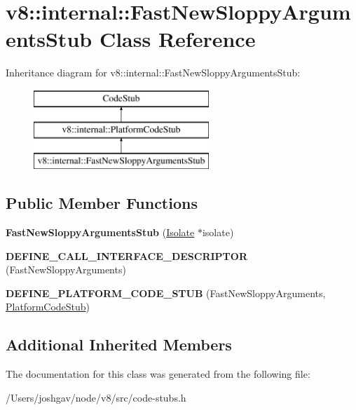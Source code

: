\hypertarget{classv8_1_1internal_1_1_fast_new_sloppy_arguments_stub}{}\section{v8\+:\+:internal\+:\+:Fast\+New\+Sloppy\+Arguments\+Stub Class Reference}
\label{classv8_1_1internal_1_1_fast_new_sloppy_arguments_stub}
Inheritance diagram for v8\+:\+:internal\+:\+:Fast\+New\+Sloppy\+Arguments\+Stub\+:\begin{figure}[H]
\begin{center}
\leavevmode
\includegraphics[height=3.000000cm]{classv8_1_1internal_1_1_fast_new_sloppy_arguments_stub}
\end{center}
\end{figure}
\subsection*{Public Member Functions}
\begin{DoxyCompactItemize}
\item 
{\bfseries Fast\+New\+Sloppy\+Arguments\+Stub} (\hyperlink{classv8_1_1internal_1_1_isolate}{Isolate} $\ast$isolate)\hypertarget{classv8_1_1internal_1_1_fast_new_sloppy_arguments_stub_a064f80177e8a72441a131e6f438150ca}{}\label{classv8_1_1internal_1_1_fast_new_sloppy_arguments_stub_a064f80177e8a72441a131e6f438150ca}

\item 
{\bfseries D\+E\+F\+I\+N\+E\+\_\+\+C\+A\+L\+L\+\_\+\+I\+N\+T\+E\+R\+F\+A\+C\+E\+\_\+\+D\+E\+S\+C\+R\+I\+P\+T\+OR} (Fast\+New\+Sloppy\+Arguments)\hypertarget{classv8_1_1internal_1_1_fast_new_sloppy_arguments_stub_a26bebc1e03f88f6cb020f7809cfec20c}{}\label{classv8_1_1internal_1_1_fast_new_sloppy_arguments_stub_a26bebc1e03f88f6cb020f7809cfec20c}

\item 
{\bfseries D\+E\+F\+I\+N\+E\+\_\+\+P\+L\+A\+T\+F\+O\+R\+M\+\_\+\+C\+O\+D\+E\+\_\+\+S\+T\+UB} (Fast\+New\+Sloppy\+Arguments, \hyperlink{classv8_1_1internal_1_1_platform_code_stub}{Platform\+Code\+Stub})\hypertarget{classv8_1_1internal_1_1_fast_new_sloppy_arguments_stub_a1eb4ee44349eb00534c01e038e920445}{}\label{classv8_1_1internal_1_1_fast_new_sloppy_arguments_stub_a1eb4ee44349eb00534c01e038e920445}

\end{DoxyCompactItemize}
\subsection*{Additional Inherited Members}


The documentation for this class was generated from the following file\+:\begin{DoxyCompactItemize}
\item 
/\+Users/joshgav/node/v8/src/code-\/stubs.\+h\end{DoxyCompactItemize}
